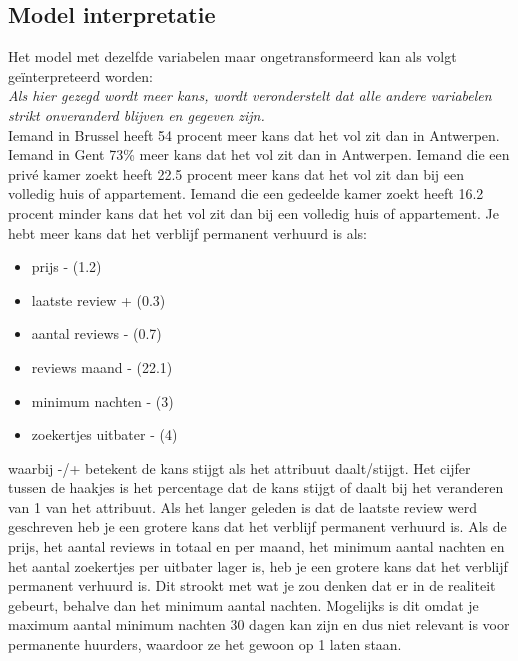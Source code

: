 \documentclass[a4paper,kulak]{kulakarticle} %
\begin{document}
\subsection{Model interpretatie}
Het model met dezelfde variabelen maar ongetransformeerd kan als volgt geïnterpreteerd worden:\\
\textit{Als hier gezegd wordt meer kans, wordt veronderstelt dat alle andere variabelen strikt onveranderd blijven en gegeven zijn.}\\
Iemand in Brussel heeft 54 procent meer kans dat het vol zit dan in Antwerpen. Iemand in Gent   73\% meer kans dat het vol zit dan in Antwerpen.
Iemand die een privé kamer zoekt heeft 22.5 procent meer kans dat het vol zit dan bij een volledig huis of appartement.
Iemand die een gedeelde kamer zoekt   heeft 16.2 procent minder kans dat het vol zit dan bij een  volledig huis of appartement.
Je hebt meer kans dat het verblijf permanent verhuurd is als:
\begin{itemize}
	\item prijs -     (1.2)
	\item laatste review  + (0.3)
	\item aantal reviews - (0.7)
	\item reviews maand - (22.1)
	\item minimum nachten - (3)
	\item zoekertjes uitbater - (4)
\end{itemize}
waarbij -/+ betekent de kans stijgt als het attribuut daalt/stijgt.
Het cijfer tussen de haakjes is het percentage dat de kans stijgt of daalt bij het veranderen van 1 van het attribuut.
Als het langer geleden is dat de laatste review werd geschreven heb je een grotere kans dat het verblijf permanent verhuurd is.
Als de prijs, het aantal reviews in totaal en per maand, het minimum aantal nachten en het aantal zoekertjes per uitbater lager is, heb je een grotere kans dat het verblijf permanent verhuurd is.
Dit strookt met wat je zou denken dat er in de realiteit gebeurt, behalve dan het minimum aantal nachten.
Mogelijks is dit omdat je maximum aantal minimum nachten 30 dagen kan zijn en dus niet relevant is voor permanente huurders, waardoor ze het gewoon op 1 laten staan.
\end{document}
